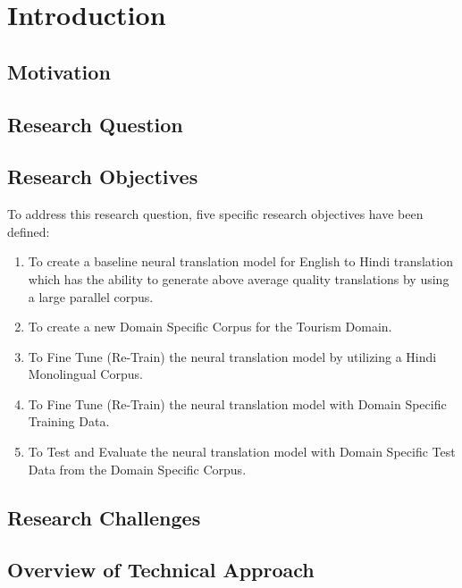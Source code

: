 
\chapter{Introduction}
\section{Motivation}
\section{Research Question}
\section{Research Objectives}
To address this research question, five specific research objectives have been defined:
\begin{enumerate}
    \item To create a baseline neural translation model for English to Hindi translation which has the ability to generate above average quality translations by using a large parallel corpus.
    \item To create a new Domain Specific Corpus for the Tourism Domain.
    \item To Fine Tune (Re-Train) the neural translation model by utilizing  a  Hindi Monolingual Corpus.
    \item To Fine Tune (Re-Train) the neural translation model with Domain Specific Training Data.
    \item To Test and Evaluate the neural translation model with Domain Specific Test Data from the Domain Specific Corpus.
\end{enumerate}
\section{Research Challenges}
\section{Overview of Technical Approach}
